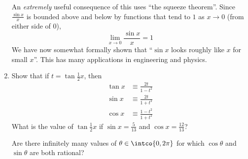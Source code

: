 \begin{enumerate}
  An \emph{extremely} useful consequence of this uses ``the squeeze theorem''.
  Since \(\frac{\sin x} x\) is bounded above and below by functions that tend to
  \(1\) as \(x \to 0\) (from either side of \(0\)),
  \begin{equation*}
   \lim_{x \to 0} \frac{\sin x}x = 1
  \end{equation*}
  We have now somewhat formally shown that ``\(\sin x\) looks roughly like \(x\)
  for small \(x\)''. This has many applications in engineering and physics.
 \item \label{q_trig_weierstrass}
  Show that if \(t = \tan \frac 12 x\), then
  \begin{align*}
   \tan x &\equiv \frac{2t}{1 - t^2} \\
   \sin x &\equiv \frac{2t}{1 + t^2} \\
   \cos x &\equiv \frac{1 - t^2}{1 + t^2}
  \end{align*}
  What is the value of \(\tan \frac 12 x\) if \(\sin x = \frac 5{13}\) and
  \(\cos x = \frac{12}{13}\)?

  Are there infinitely many values of \(\theta \in \intco{0, 2\pi}\) for which
  \(\cos \theta\) and \(\sin \theta\) are both rational?
\end{enumerate}
